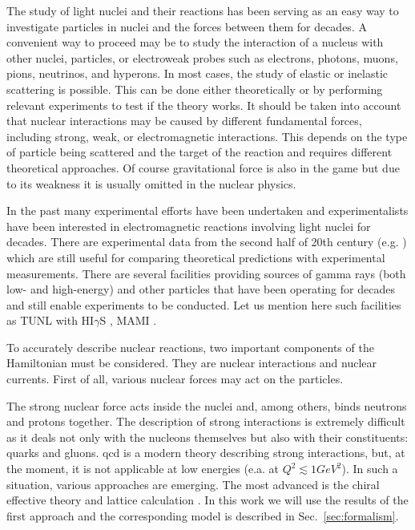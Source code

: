 The study of light nuclei and their reactions has been serving as an easy way to investigate particles in nuclei and
the forces between them for decades. A convenient way to proceed may be to study the interaction of a nucleus with
other nuclei, particles, or electroweak probes such as electrons, photons, muons, pions, neutrinos, and hyperons.
In most cases, the study of elastic or inelastic scattering is possible. This can be done either theoretically or by
performing relevant experiments to test if the theory works. It should be taken into account that nuclear 
interactions may be
caused by different fundamental forces, including strong, weak, or electromagnetic
interactions. This depends on the type of particle being scattered and the target of the reaction
and requires different theoretical approaches.
Of course gravitational force is also in the game but due to its weakness it is 
usually omitted in the nuclear physics. 

In the past many experimental efforts have been undertaken and
experimentalists have been interested in electromagnetic reactions involving light nuclei for decades.
There are experimental data from the second half of 20th century 
(e.g. \cite{Skopik1974, Liuexp68, Kose1969MeasurementsOT, Kamae}) which are still 
useful for comparing theoretical predictions with experimental measurements.    
There are several facilities providing sources of gamma rays (both low- and high-energy)
and other particles that have been operating for decades and still enable experiments to be conducted.
Let us mention here such facilities as TUNL with HI$\gamma$S \cite{TUNL, TONCHEV2005170}, MAMI \cite{MAMI}. 

To accurately describe nuclear reactions, two important components of the Hamiltonian must be considered.
They are nuclear interactions and nuclear currents.
First of all, various nuclear forces may act on
the particles.

The strong nuclear force acts inside the nuclei and, among others, binds neutrons 
and protons together. The description of strong interactions is extremely
difficult as it deals not only with the nucleons themselves but also with their constituents: quarks
and gluons. \gls{qcd} is a modern theory
describing strong interactions, but, at the moment,
it is not applicable at low energies (e.a. at $Q^2 \lesssim 1 GeV^2$).
In such a situation, various approaches are emerging.
The most advanced is the
chiral effective theory and lattice calculation \cite{IOFFE2006232, BEANElaticce, Machleidt2011}.
In this work we will use the results of the first approach
and the corresponding model is described in Sec.~\ref{sec:formalism}.

